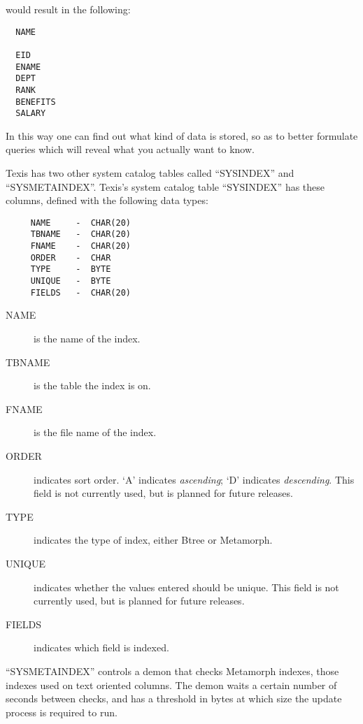 would result in the following:

\begin{screen}
\begin{verbatim}
  NAME

  EID
  ENAME
  DEPT
  RANK
  BENEFITS
  SALARY
\end{verbatim}
\end{screen}

In this way one can find out what kind of data is stored, so as to
better formulate queries which will reveal what you actually want to
know.

Texis has two other system catalog tables called ``SYSINDEX'' and
``SYSMETAINDEX''.  Texis's system catalog table ``SYSINDEX'' has these
columns, defined with the following data types:

\begin{verbatim}
     NAME     -  CHAR(20)
     TBNAME   -  CHAR(20)
     FNAME    -  CHAR(20)
     ORDER    -  CHAR
     TYPE     -  BYTE
     UNIQUE   -  BYTE
     FIELDS   -  CHAR(20)
\end{verbatim}

\begin{description}
\item[NAME] is the name of the index.

\item[TBNAME] is the table the index is on.

\item[FNAME] is the file name of the index.

\item[ORDER] indicates sort order.  `A' indicates {\em ascending}; `D'
indicates {\em descending}.  This field is not currently used, but is
planned for future releases.

\item[TYPE] indicates the type of index, either Btree or Metamorph.

\item[UNIQUE] indicates whether the values entered should be unique.
This field is not currently used, but is planned for future releases.

\item[FIELDS] indicates which field is indexed.
\end{description}

``SYSMETAINDEX'' controls a demon that checks Metamorph indexes, those
indexes used on text oriented columns.  The demon waits a certain
number of seconds between checks, and has a threshold in bytes at
which size the update process is required to run.

